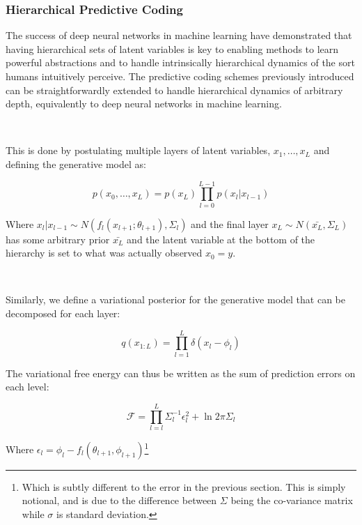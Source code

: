 \documentclass{article}
\begin{document}
\subsubsection{Hierarchical Predictive Coding}

The success of deep neural networks in machine learning have demonstrated that having hierarchical sets of latent variables is key to enabling methods to learn powerful abstractions and to handle intrinsically hierarchical dynamics of the sort humans intuitively perceive. The predictive coding schemes previously introduced can be straightforwardly extended to handle hierarchical dynamics of arbitrary depth, equivalently to deep neural networks in machine learning.

\

This is done by postulating multiple layers of latent variables, $x_1, \dots, x_L$ and defining the generative model as:

\begin{equation}
	p(x_0, \dots, x_L) = p(x_L) \prod_{l = 0}^{L - 1} p(x_l | x_{l-1})
\end{equation}

Where $x_l | x_{l - 1} \sim N(f_l(x_{l + 1}; \theta_{l + 1}) , \Sigma_l)$ and the final layer $x_L \sim N(\bar{x_L}, \Sigma_L)$ has some arbitrary prior $\bar{x_L}$ and the latent variable at the bottom of the hierarchy is set to what was actually observed $x_0 = y$. 

\

Similarly, we define a variational posterior for the generative model that can be decomposed for each layer:

\begin{equation}
	q(x_{1:L}) = \prod^L_{l = 1} \delta(x_l - \phi_l)
\end{equation}

The variational free energy can thus be written as the sum of prediction errors on each level:

\begin{equation}\label{eq:vfe_pc_hierarchical}
\mathcal{F} = \prod_{l = l}^{L} \Sigma_l^{-1} \epsilon_l^2 + \ln 2 \pi \Sigma_l
\end{equation}

Where $\epsilon_l = \phi_l - f_l(\theta_{l + 1}, \phi_{l + 1})$\footnote{Which is subtly different to the error in the previous section. This is simply notional, and is due to the difference between $\Sigma$ being the co-variance matrix while $\sigma$ is standard deviation.}
\end{document}
